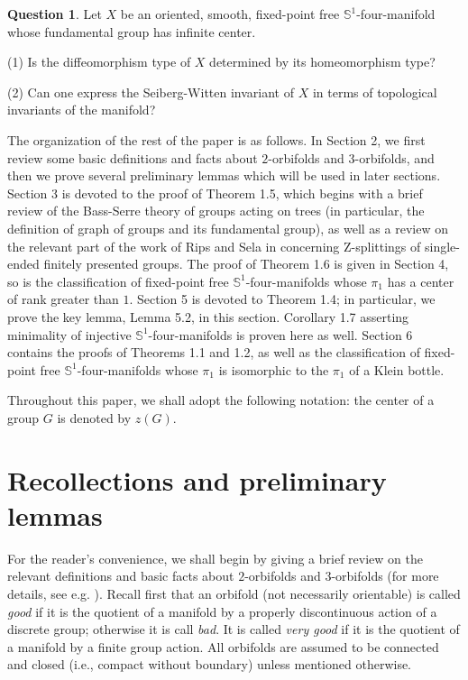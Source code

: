 \documentclass[11pt]{amsart}
\theoremstyle{plain}
\numberwithin{theorem}{section}
\theoremstyle{definition}
\newtheorem{question}[theorem]{Question}
\begin{document}
\begin{question}
Let $X$ be an oriented, smooth, fixed-point free ${{\mathbb S}}^1$-four-manifold whose fundamental group 
has infinite center.

(1) Is the diffeomorphism type of $X$ determined by its homeomorphism type?

(2) Can one express the Seiberg-Witten invariant of $X$ in terms of topological invariants 
of the manifold?
\end{question} 

\vspace{3mm}

The organization of the rest of the paper is as follows. In Section 2, we first review some
basic definitions and facts about $2$-orbifolds and $3$-orbifolds, and then we prove several
preliminary lemmas which will be used in later sections. Section 3 is devoted to the proof of 
Theorem 1.5, which begins with a brief review of the Bass-Serre theory of groups acting 
on trees (in particular, the definition of graph of groups and its fundamental group), as well 
as a review on the relevant part of the work of Rips and Sela in \cite{RipS} concerning 
Z-splittings of single-ended finitely presented groups. The proof of Theorem 1.6 is given in 
Section 4, so is the classification of fixed-point free ${{\mathbb S}}^1$-four-manifolds 
whose $\pi_1$ has a center of rank greater than $1$. Section 5 is devoted to 
Theorem 1.4; in particular, we prove the key lemma, Lemma 5.2, in this section. Corollary 1.7 
asserting minimality of injective ${{\mathbb S}}^1$-four-manifolds is proven here as well. Section 6 contains 
the proofs of Theorems 1.1 and 1.2, as well as the classification of fixed-point free 
${{\mathbb S}}^1$-four-manifolds whose $\pi_1$ is isomorphic to the $\pi_1$ of a Klein bottle.

Throughout this paper, we shall adopt the following notation: the center of a group $G$ is 
denoted by $z(G)$.

\section{Recollections and preliminary lemmas}

For the reader's convenience, we shall begin by giving a brief review on the relevant definitions and 
basic facts about $2$-orbifolds and $3$-orbifolds (for more details, see e.g. \cite{Sct, BMP}). Recall 
first that an orbifold (not necessarily orientable) is called {\it good} if it is the quotient of a manifold by a properly discontinuous action of a discrete group; otherwise it is call {\it bad}. It is called {\it very good} 
if it is the quotient of a manifold by a finite group action. All orbifolds are assumed to be connected and closed (i.e., compact without boundary) unless mentioned otherwise.
\end{document}
